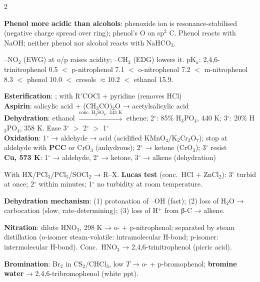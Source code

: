 \documentclass[9pt,a4paper]{extarticle}
\begin{document}
\begin{multicols}{2}
\begin{fl}
\item \textbf{Phenol more acidic than alcohols}: phenoxide ion is resonance-stabilised (negative charge spread over ring); phenol's O on sp$^2$ C. Phenol reacts with NaOH; neither phenol nor alcohol reacts with NaHCO$_3$.
\item –NO$_2$ (EWG) at o/p raises acidity; –CH$_3$ (EDG) lowers it. pK$_a$: 2,4,6-trinitrophenol 0.5 $<$ p-nitrophenol 7.1 $<$ o-nitrophenol 7.2 $<$ m-nitrophenol 8.3 $<$ phenol 10.0 $<$ cresols $\approx$10.2 $<$ ethanol 15.9.
\end{fl}
\begin{kbox}
\textbf{Esterification}: ; with R$'$COCl + pyridine (removes HCl)\\
\textbf{Aspirin}: salicylic acid + (CH$_3$CO)$_2$O → acetylsalicylic acid\\
\textbf{Dehydration}: ethanol $\xrightarrow{\text{conc. H}_2\text{SO}_4,\;443\text{ K}}$ ethene; 2$^\circ$: 85\% H$_3$PO$_4$, 440 K; 3$^\circ$: 20\% H$_3$PO$_4$, 358 K. Ease 3$^\circ$ $>$ 2$^\circ$ $>$ 1$^\circ$\\
\textbf{Oxidation}: 1$^\circ$ → aldehyde → acid (acidified KMnO$_4$/K$_2$Cr$_2$O$_7$); stop at aldehyde with \textbf{PCC} or CrO$_3$ (anhydrous); 2$^\circ$ → ketone (CrO$_3$); 3$^\circ$ resist\\
\textbf{Cu, 573 K}: 1$^\circ$ → aldehyde, 2$^\circ$ → ketone, 3$^\circ$ → alkene (dehydration)
\end{kbox}
\begin{fl}
\item With HX/PCl$_3$/PCl$_5$/SOCl$_2$ → R--X. \textbf{Lucas test} (conc.\ HCl + ZnCl$_2$): 3$^\circ$ turbid at once; 2$^\circ$ within minutes; 1$^\circ$ no turbidity at room temperature.
\item \textbf{Dehydration mechanism}: (1) protonation of --OH (fast); (2) loss of H$_2$O → carbocation (slow, rate-determining); (3) loss of H$^+$ from β-C → alkene.
\end{fl}
\begin{fl}
\item \textbf{Nitration}: dilute HNO$_3$, 298 K → o- + p-nitrophenol; separated by steam distillation (o-isomer steam-volatile: intramolecular H-bond; p-isomer: intermolecular H-bond). Conc.\ HNO$_3$ → 2,4,6-trinitrophenol (picric acid).
\item \textbf{Bromination}: Br$_2$ in CS$_2$/CHCl$_3$, low $T$ → o- + p-bromophenol; \textbf{bromine water} → 2,4,6-tribromophenol (white ppt).

\end{fl}
\end{multicols}
\end{document}
